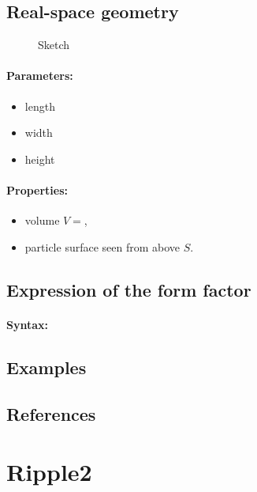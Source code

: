 \subsection{Real-space geometry}


\begin{figure}[ht]
\begin{center}
\caption{Sketch}
\end{center}
\end{figure}

\paragraph{Parameters:}
\begin{itemize}
\item length 
\item width 
\item height 
\end{itemize}

\paragraph{Properties:}
\begin{itemize}
\item volume $V = $,
\item particle surface seen from above $S $.
\end{itemize}

\subsection{Expression of the form factor}

\paragraph{Syntax:} 

\subsection{Examples}


\subsection{References}


\newpage{\cleardoublepage}
\section{Ripple2}   

